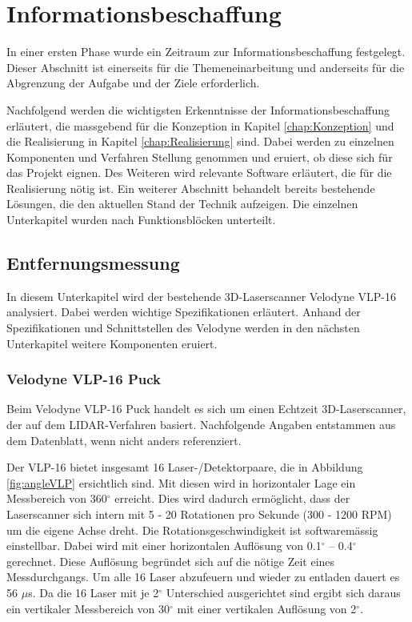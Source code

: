 \chapter{Informationsbeschaffung}
\label{Informationsbeschaffung}
 In einer ersten Phase wurde ein Zeitraum zur Informationsbeschaffung festgelegt. Dieser Abschnitt ist einerseits für die Themeneinarbeitung und anderseits für die Abgrenzung der Aufgabe und der Ziele erforderlich.

Nachfolgend werden die wichtigsten Erkenntnisse der Informationsbeschaffung erläutert, die massgebend für die Konzeption in Kapitel \ref{chap:Konzeption} und die Realisierung in Kapitel \ref{chap:Realisierung} sind. Dabei werden zu einzelnen Komponenten und Verfahren Stellung genommen und eruiert, ob diese sich für das Projekt eignen. Des Weiteren wird relevante Software erläutert, die für die Realisierung nötig ist. Ein weiterer Abschnitt behandelt bereits bestehende Lösungen, die den aktuellen Stand der Technik aufzeigen. Die einzelnen Unterkapitel wurden nach Funktionsblöcken unterteilt.

\section{Entfernungsmessung}
\label{sec:Entfernungsmessung}
In diesem Unterkapitel wird der bestehende 3D-Laserscanner Velodyne VLP-16 analysiert. Dabei werden wichtige Spezifikationen erläutert. Anhand der Spezifikationen und Schnittstellen des Velodyne werden in den nächsten Unterkapitel weitere Komponenten eruiert.   

\subsection{Velodyne VLP-16 Puck}
\label{subsec:Velodyne}
Beim Velodyne VLP-16 Puck handelt es sich um einen Echtzeit 3D-Laserscanner, der auf dem \ac{LIDAR}-Verfahren basiert. Nachfolgende Angaben entstammen aus dem Datenblatt, wenn nicht anders referenziert. \protect\cite{velodyne}

Der VLP-16 bietet insgesamt 16 Laser-/Detektorpaare, die in Abbildung \ref{fig:angleVLP} ersichtlich sind. Mit diesen wird in horizontaler Lage ein Messbereich von 360$^\circ$  erreicht. Dies wird dadurch ermöglicht, dass der Laserscanner sich intern mit 5 - 20 Rotationen pro Sekunde (300 - 1200 RPM) um die eigene Achse dreht. Die Rotationsgeschwindigkeit ist softwaremässig einstellbar. Dabei wird mit einer horizontalen Auflösung von 0.1$^\circ$ – 0.4$^\circ$ gerechnet. Diese Auflösung begründet sich auf die nötige Zeit eines Messdurchgangs. Um alle 16 Laser abzufeuern und wieder zu entladen dauert es 56 $\mu$s.
Da die 16 Laser mit je 2$^\circ$ Unterschied ausgerichtet sind ergibt sich daraus ein vertikaler Messbereich von 30$^\circ$ mit einer vertikalen Auflösung von 2$^\circ$. 

